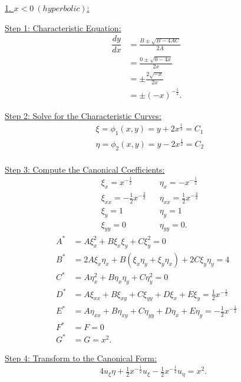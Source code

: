 \documentclass{article}
\begin{document}
\underline{1. $x < 0 \: (hyperbolic)$:}
\newline

\quad \underline{Step 1: Characteristic Equation:}
\begin{align*}
  \dfrac{dy}{dx} &= \frac{B \pm \sqrt{B - 4AC}}{2A} &&\\
  &= \frac{0 \pm \sqrt{0 - 4x}}{2x} &&\\
  &= \pm \frac{2 \sqrt{-x}}{2x} &&\\
  &= \pm (-x)^{-\frac{1}{2}}.
\end{align*}

\quad \underline{Step 2: Solve for the Characteristic Curves:}
\begin{align*}
  &\xi = \phi_1(x, y) = y + 2x^{\frac{1}{2}} = C_1 &&\\
  &\eta = \phi_2(x, y) = y - 2x^{\frac{1}{2}} = C_2 &&\\
\end{align*}

\quad \underline{Step 3: Compute the Canonical Coefficients:}
\begin{align*}
  &\xi_x = x^{-\frac{1}{2}} &&
  \eta_x = -x^{-\frac{1}{2}} &&\\
  &\xi_{xx} = -\frac{1}{2} x^{-\frac{3}{2}} &&
  \eta_{xx} = \frac{1}{2} x^{-\frac{3}{2}} &&\\
  &\xi_y = 1 &&
  \eta_y = 1 &&\\
  &\xi_{yy} = 0 &&
  \eta_{yy} = 0.
\end{align*}
\begin{align*}
  A^* &= A \xi_{x}^2 + B \xi_{x}\xi_{y} + C \xi_{y}^2 
  = 0 &&\\
  B^* &= 2A \xi_{x} \eta_{x} + B(\xi_{x} \eta_{y} + \xi_{y} \eta_{x}) + 2C \xi_{y} \eta_{y} 
  = 4 &&\\
  C^* &= A\eta_{x}^2 + B \eta_{x} \eta_{y} + C \eta_{y}^2 
  = 0 &&\\
  D^* &= A \xi_{xx} + B \xi_{xy} + C \xi_{yy} + D \xi_{x} + E \xi_{y} 
  = \frac{1}{2} x^{-\frac{1}{2}} &&\\
  E^* &= A \eta_{xx} + B \eta_{xy} + C \eta_{yy} + D \eta_{x} + E \eta_{y} 
  = - \frac{1}{2} x^{-\frac{1}{2}} &&\\
  F^* &= F = 0 &&\\
  G^* &= G = x^2.
\end{align*}

\quad \underline{Step 4: Transform to the Canonical Form:}
\begin{align*}
  4u_{\xi}{\eta} +
  \frac{1}{2} x^{-\frac{1}{2}} u_{\xi} - \frac{1}{2} x^{-\frac{1}{2}} u_{\eta} = x^2.
\end{align*}
\end{document}
